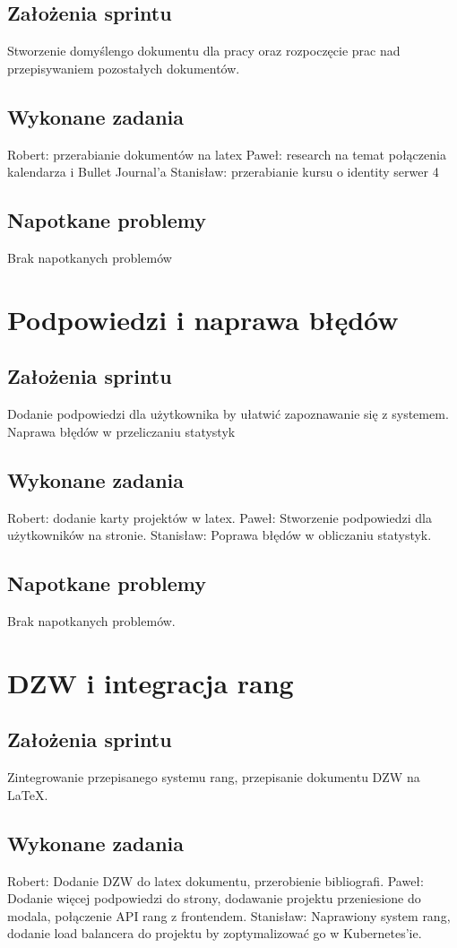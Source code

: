 \documentclass[a4paper,11pt]{report}
\begin{document}
\subsection {Założenia sprintu}
Stworzenie domyślengo dokumentu dla pracy oraz rozpoczęcie prac nad przepisywaniem pozostałych dokumentów.
\subsection {Wykonane zadania}
Robert: przerabianie dokumentów na latex 
Paweł: research na temat połączenia kalendarza i Bullet Journal'a  
Stanisław: przerabianie kursu o identity serwer 4 
\subsection {Napotkane problemy}
Brak napotkanych problemów




\section {Podpowiedzi i naprawa błędów}
\subsection {Założenia sprintu}
Dodanie podpowiedzi dla użytkownika by ułatwić zapoznawanie się z systemem. Naprawa błędów w przeliczaniu statystyk
\subsection {Wykonane zadania}
Robert: dodanie karty projektów w latex.
Paweł: Stworzenie podpowiedzi dla użytkowników na stronie. 
Stanisław: Poprawa błędów w obliczaniu statystyk.  
\subsection {Napotkane problemy}
Brak napotkanych problemów.

\section {DZW i integracja rang}
\subsection {Założenia sprintu}
Zintegrowanie przepisanego systemu rang, przepisanie dokumentu DZW na LaTeX.
\subsection {Wykonane zadania}
Robert: Dodanie DZW do latex dokumentu, przerobienie bibliografi. 
Paweł: Dodanie więcej podpowiedzi do strony, dodawanie projektu przeniesione do modala, połączenie API rang z frontendem.
Stanisław: Naprawiony system rang, dodanie load balancera do projektu by zoptymalizować go w Kubernetes'ie.    
\end{document}
